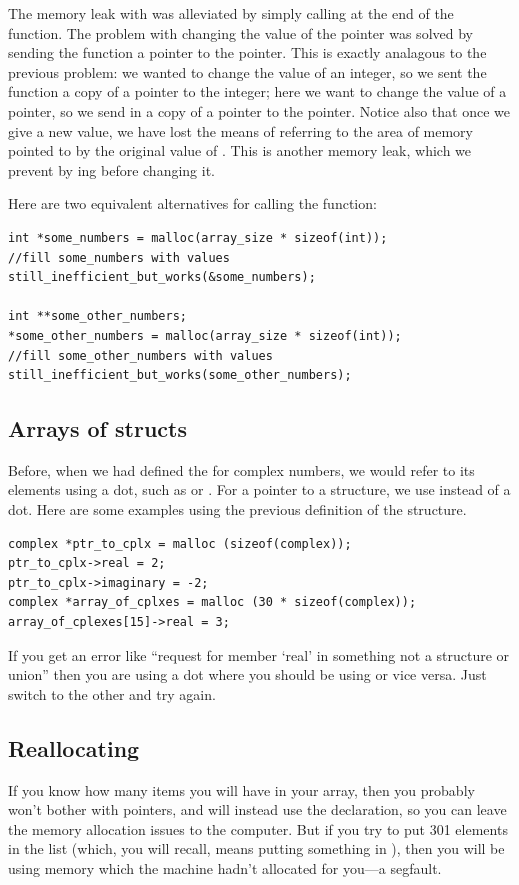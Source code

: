 \documentclass[12pt]{article}
\makeatletter
\def\ttind#1{\index{#1@\cinline{#1}}\cinline{#1}}
\makeatother
\begin{document}
The memory leak with  was alleviated by simply calling  at the end of the
function. The problem with changing the value of the pointer was solved by sending the function a pointer
to the pointer. This is exactly analagous to the previous problem: we wanted to change the value of an
integer, so we sent the function a copy of a pointer to the integer; here we want to change the value of a
pointer, so we send in a copy of a pointer to the pointer. Notice also that once we give 
a new value, we have lost the means of referring to the area of memory pointed to by the original value of
. This is another memory leak, which we prevent by ing  before
changing it.

Here are two equivalent alternatives for calling the function:
\begin{lstlisting}
int *some_numbers = malloc(array_size * sizeof(int));
//fill some_numbers with values
still_inefficient_but_works(&some_numbers);

int **some_other_numbers;
*some_other_numbers = malloc(array_size * sizeof(int));
//fill some_other_numbers with values
still_inefficient_but_works(some_other_numbers);
\end{lstlisting}

\subsection{Arrays of structs}	
Before, when we had defined the \ttind{struct} for complex numbers, we would refer to its elements using a
dot, such as  or . For a pointer to a structure, we use \cinline{$->$} instead of 
a dot.  Here are some examples using the previous definition of the  structure.
\begin{lstlisting}
complex *ptr_to_cplx = malloc (sizeof(complex));
ptr_to_cplx->real = 2;
ptr_to_cplx->imaginary = -2;
complex *array_of_cplxes = malloc (30 * sizeof(complex));
array_of_cplexes[15]->real = 3;
\end{lstlisting}

If you get an error like ``request for member `real' in something not a structure or union'' then you are
using a dot where you should be using \ttind{$->$} or vice versa. Just switch to the other and try again.


\subsection{Reallocating} If you know how many items you will have
in your array, then you probably won't bother with pointers, and will
instead use the  declaration, so you can leave
the memory allocation issues to the computer. But if you try to put 301
elements in the list (which, you will recall, means putting something
in ), then you will be using memory which the
machine hadn't
allocated for you---a segfault.
\end{document}
